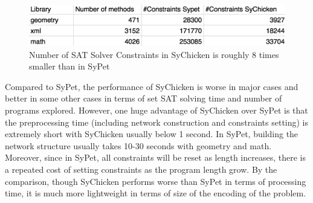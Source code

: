 \documentclass[twocolumn]{article}
\begin{document}
\begin{figure}[h]
  \includegraphics[width = \linewidth]{nconstr.png}
\caption{Number of SAT Solver Constraints in SyChicken is roughly 8 times smaller than in SyPet}
\end{figure}
Compared to SyPet, the performance of SyChicken is worse in major cases and better in some other cases in terms of set SAT solving time and number of programs explored. However, one huge advantage of SyChicken over SyPet is that the preprocessing time (including network construction and constraints setting) is extremely short with SyChicken usually below 1 second. In SyPet, building the network structure usually takes 10-30 seconds with geometry and math. Moreover, since in SyPet, all constraints will be reset as length increases, there is a repeated cost of setting constraints as the program length grow. By the comparison, though SyChicken performs worse than SyPet in terms of processing time, it is much more lightweight in terms of size of the encoding of the problem.
\end{document}
